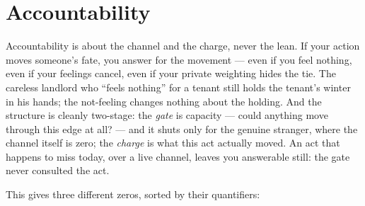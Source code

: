 \section{Accountability}
\label{sec:explainer:accountability}

Accountability is about the channel and the charge, never the lean. If your action moves someone's fate, you answer for the movement --- even if you feel nothing, even if your feelings cancel, even if your private weighting hides the tie. The careless landlord who ``feels nothing'' for a tenant still holds the tenant's winter in his hands; the not-feeling changes nothing about the holding. And the structure is cleanly two-stage: the \emph{gate} is capacity --- could anything move through this edge at all? --- and it shuts only for the genuine stranger, where the channel itself is zero; the \emph{charge} is what this act actually moved. An act that happens to miss today, over a live channel, leaves you answerable still: the gate never consulted the act.

This gives three different zeros, sorted by their quantifiers:
\par
